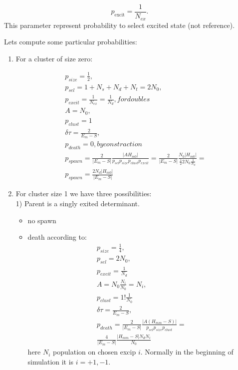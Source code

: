 \documentclass[twoside,english]{uiofysmaster}
\theoremstyle{definition}
\begin{document}
\begin{equation}
p_{\text{excit}} = \frac{1}{N_{ex}}.
\end{equation}
This parameter represent probability to select excited state (not reference).





Lets compute some particular probabilities:\\



\begin{enumerate}
\item For a cluster of size zero:

\begin{align}
p_{size} = \frac{1}{2},\\
p_{sel} = 1+N_{s}+N_{d}+N_{t} = 2N_0,\\
p_{excit}=\frac{1}{N_{ex}} = \frac{1}{N_d}, for doubles\\
A = N_0,\\
p_{clust}=1\\
\delta \tau = \frac{2}{E_m  - S},\\
p_{death}=0, by constraction\\
p_{spawn} = \frac{2}{|E_m  - S|} \frac{|AH_{m0}|}{ p_{sel}  p_{size} p_{clust}p_{excit} }=
\frac{2}{|E_m  - S|} \frac{N_0|H_{m0}|}{ \frac{1}{2}  2N_0 \frac{1}{N_d} }=\\
p_{spawn} = \frac{2N_d|H_{m0}|}{|E_m  - S|} 
\end{align}
 
\item For cluster size 1 we have three possibilities:\\
1) Parent is a singly exited determinant.

\begin{itemize}
	\item no spawn
	\item death according to:
\begin{align}
p_{size} = \frac{1}{4},\\
p_{sel} =  2N_0,\\
p_{excit}= \frac{1}{N_d}\\
A = N_0\frac{N_i}{N_0}=N_i,\\
p_{clust}=1!\frac{1}{N_0}\\
\delta \tau = \frac{2}{E_m  - S},\\
p_{death} = \frac{2}{|E_m - S|} \frac{|A(H_{mm}-S)|}{ p_{sel}  p_{size} p_{clust} }=\\
\frac{4}{|E_m  - S|} \frac{|H_{mm}-S|N_dN_i}{N_0 }
\end{align}
here $N_i$ population on chosen excip $i$. Normally in the beginning of simulation it is $i= +1,-1$.
\end{itemize}


\end{enumerate}
\end{document}
